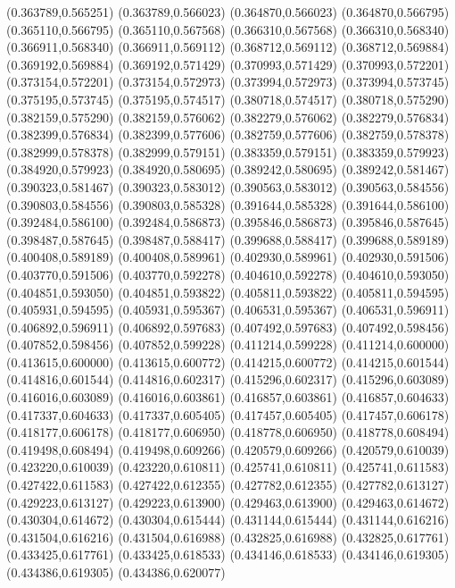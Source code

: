 (0.363789,0.565251)
(0.363789,0.566023)
(0.364870,0.566023)
(0.364870,0.566795)
(0.365110,0.566795)
(0.365110,0.567568)
(0.366310,0.567568)
(0.366310,0.568340)
(0.366911,0.568340)
(0.366911,0.569112)
(0.368712,0.569112)
(0.368712,0.569884)
(0.369192,0.569884)
(0.369192,0.571429)
(0.370993,0.571429)
(0.370993,0.572201)
(0.373154,0.572201)
(0.373154,0.572973)
(0.373994,0.572973)
(0.373994,0.573745)
(0.375195,0.573745)
(0.375195,0.574517)
(0.380718,0.574517)
(0.380718,0.575290)
(0.382159,0.575290)
(0.382159,0.576062)
(0.382279,0.576062)
(0.382279,0.576834)
(0.382399,0.576834)
(0.382399,0.577606)
(0.382759,0.577606)
(0.382759,0.578378)
(0.382999,0.578378)
(0.382999,0.579151)
(0.383359,0.579151)
(0.383359,0.579923)
(0.384920,0.579923)
(0.384920,0.580695)
(0.389242,0.580695)
(0.389242,0.581467)
(0.390323,0.581467)
(0.390323,0.583012)
(0.390563,0.583012)
(0.390563,0.584556)
(0.390803,0.584556)
(0.390803,0.585328)
(0.391644,0.585328)
(0.391644,0.586100)
(0.392484,0.586100)
(0.392484,0.586873)
(0.395846,0.586873)
(0.395846,0.587645)
(0.398487,0.587645)
(0.398487,0.588417)
(0.399688,0.588417)
(0.399688,0.589189)
(0.400408,0.589189)
(0.400408,0.589961)
(0.402930,0.589961)
(0.402930,0.591506)
(0.403770,0.591506)
(0.403770,0.592278)
(0.404610,0.592278)
(0.404610,0.593050)
(0.404851,0.593050)
(0.404851,0.593822)
(0.405811,0.593822)
(0.405811,0.594595)
(0.405931,0.594595)
(0.405931,0.595367)
(0.406531,0.595367)
(0.406531,0.596911)
(0.406892,0.596911)
(0.406892,0.597683)
(0.407492,0.597683)
(0.407492,0.598456)
(0.407852,0.598456)
(0.407852,0.599228)
(0.411214,0.599228)
(0.411214,0.600000)
(0.413615,0.600000)
(0.413615,0.600772)
(0.414215,0.600772)
(0.414215,0.601544)
(0.414816,0.601544)
(0.414816,0.602317)
(0.415296,0.602317)
(0.415296,0.603089)
(0.416016,0.603089)
(0.416016,0.603861)
(0.416857,0.603861)
(0.416857,0.604633)
(0.417337,0.604633)
(0.417337,0.605405)
(0.417457,0.605405)
(0.417457,0.606178)
(0.418177,0.606178)
(0.418177,0.606950)
(0.418778,0.606950)
(0.418778,0.608494)
(0.419498,0.608494)
(0.419498,0.609266)
(0.420579,0.609266)
(0.420579,0.610039)
(0.423220,0.610039)
(0.423220,0.610811)
(0.425741,0.610811)
(0.425741,0.611583)
(0.427422,0.611583)
(0.427422,0.612355)
(0.427782,0.612355)
(0.427782,0.613127)
(0.429223,0.613127)
(0.429223,0.613900)
(0.429463,0.613900)
(0.429463,0.614672)
(0.430304,0.614672)
(0.430304,0.615444)
(0.431144,0.615444)
(0.431144,0.616216)
(0.431504,0.616216)
(0.431504,0.616988)
(0.432825,0.616988)
(0.432825,0.617761)
(0.433425,0.617761)
(0.433425,0.618533)
(0.434146,0.618533)
(0.434146,0.619305)
(0.434386,0.619305)
(0.434386,0.620077)
